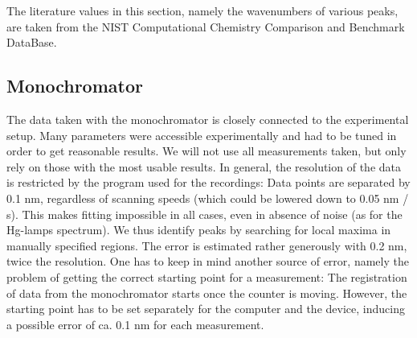 The literature values in this section, namely the wavenumbers of various peaks, are taken from the NIST 
Computational Chemistry Comparison and Benchmark DataBase\cite{nist}.

\subsection{Monochromator}
The data taken with the monochromator is closely connected to the experimental setup. Many parameters were accessible 
experimentally and had to be tuned in order to get reasonable results. We will not use all measurements taken, but only 
rely on those with the most usable results. In general, the resolution of the data is restricted by the program used for 
the recordings: Data points are separated by 0.1 nm, regardless of scanning speeds (which could be lowered down to 0.05 
nm / s). This makes fitting impossible in all cases, even in absence of noise (as for the Hg-lamps spectrum). We thus 
identify peaks by searching for local maxima in manually specified regions. The error is estimated rather generously with 
0.2 nm, twice the resolution. One has to keep in mind another source of error, namely the problem of getting the correct 
starting point for a measurement: The registration of data from the monochromator starts once the counter is moving.
However, the starting point has to be set separately for the computer and the device, inducing a possible error of ca. 
0.1 nm for each measurement. 

